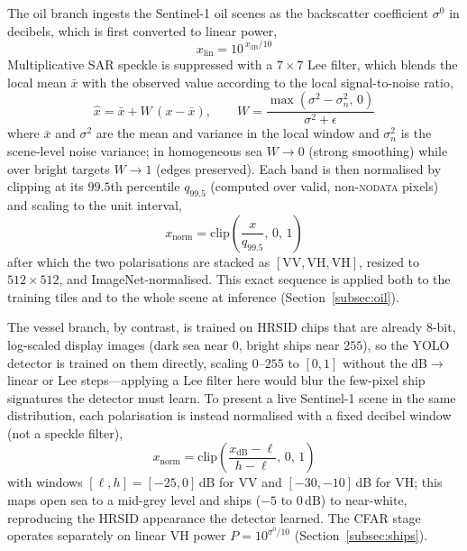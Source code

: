 \documentclass{ieeeaccess}
\begin{document}
The oil branch ingests the Sentinel-1 oil scenes as the backscatter coefficient $\sigma^0$ in decibels, which is first converted to linear power,
\begin{equation}
x_{\text{lin}} = 10^{\,x_{\text{dB}}/10}
\label{eq:dblin}
\end{equation}
Multiplicative SAR speckle is suppressed with a $7\times7$ Lee filter, which blends the local mean $\bar{x}$ with the observed value according to the local signal-to-noise ratio,
\begin{equation}
\hat{x} = \bar{x} + W\,(x - \bar{x}),
\qquad
W = \frac{\max(\sigma^2 - \sigma_n^2,\,0)}{\sigma^2 + \epsilon}
\label{eq:lee}
\end{equation}
where $\bar{x}$ and $\sigma^2$ are the mean and variance in the local window and $\sigma_n^2$ is the scene-level noise variance; in homogeneous sea $W\!\to\!0$ (strong smoothing) while over bright targets $W\!\to\!1$ (edges preserved). Each band is then normalised by clipping at its $99.5$th percentile $q_{99.5}$ (computed over valid, non-\textsc{nodata} pixels) and scaling to the unit interval,
\begin{equation}
x_{\text{norm}} = \mathrm{clip}\!\left(\frac{x}{q_{99.5}},\,0,\,1\right)
\label{eq:pctnorm}
\end{equation}
after which the two polarisations are stacked as $[\text{VV},\text{VH},\text{VH}]$, resized to $512\times512$, and ImageNet-normalised. This exact sequence is applied both to the training tiles and to the whole scene at inference (Section~\ref{subsec:oil}).

The vessel branch, by contrast, is trained on HRSID chips that are already 8-bit, log-scaled display images (dark sea near $0$, bright ships near $255$), so the YOLO detector is trained on them directly, scaling $0$--$255$ to $[0,1]$ without the dB$\to$linear or Lee steps---applying a Lee filter here would blur the few-pixel ship signatures the detector must learn. To present a live Sentinel-1 scene in the same distribution, each polarisation is instead normalised with a fixed decibel window (not a speckle filter),
\begin{equation}
x_{\text{norm}} = \mathrm{clip}\!\left(\frac{x_{\text{dB}} - \ell}{h - \ell},\,0,\,1\right)
\label{eq:dbwin}
\end{equation}
with windows $[\ell,h]=[-25,0]$\,dB for VV and $[-30,-10]$\,dB for VH; this maps open sea to a mid-grey level and ships ($-5$ to $0$\,dB) to near-white, reproducing the HRSID appearance the detector learned. The CFAR stage operates separately on linear VH power $P=10^{\sigma^0/10}$ (Section~\ref{subsec:ships}).
\end{document}
